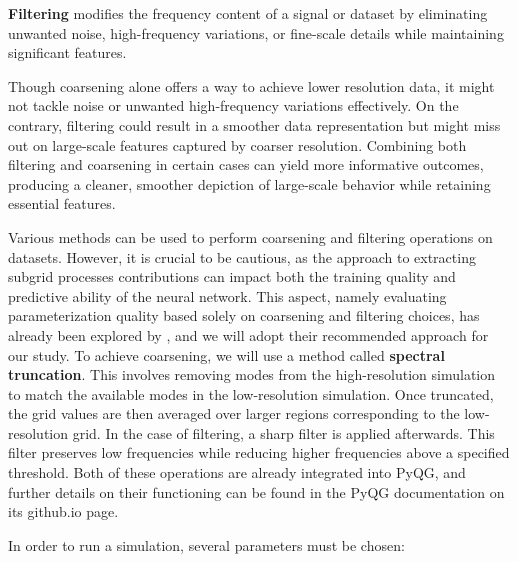 \newpage

\textbf{Filtering} modifies the frequency content of a signal or dataset by eliminating unwanted noise, high-frequency variations, or fine-scale details while maintaining significant features.\\

\vspace{-0.1em}

Though coarsening alone offers a way to achieve lower resolution data, it might not tackle noise or unwanted high-frequency variations effectively. On the contrary, filtering could result in a smoother data representation but might miss out on large-scale features captured by coarser resolution. Combining both filtering and coarsening in certain cases can yield more informative outcomes, producing a cleaner, smoother depiction of large-scale behavior while retaining essential features.\\

\vspace{-0.1em}

Various methods can be used to perform coarsening and filtering operations on datasets. However, it is crucial to be cautious, as the approach to extracting subgrid processes contributions can impact both the training quality and predictive ability of the neural network. This aspect, namely evaluating parameterization quality based solely on coarsening and filtering choices, has already been explored by \citep{Benchmarking}, and we will adopt their recommended approach for our study. To achieve coarsening, we will use a method called \textbf{spectral truncation}. This involves removing modes from the high-resolution simulation to match the available modes in the low-resolution simulation. Once truncated, the grid values are then averaged over larger regions corresponding to the low-resolution grid. In the case of filtering, a sharp filter is applied afterwards. This filter preserves low frequencies while reducing higher frequencies above a specified threshold. Both of these operations are already integrated into PyQG, and further details on their functioning can be found in the PyQG documentation on its github.io page.

\vspace{-0.1em}

In order to run a simulation, several parameters must be chosen:\\

\vspace{-1.5em}
\vspace{-0.2em}

